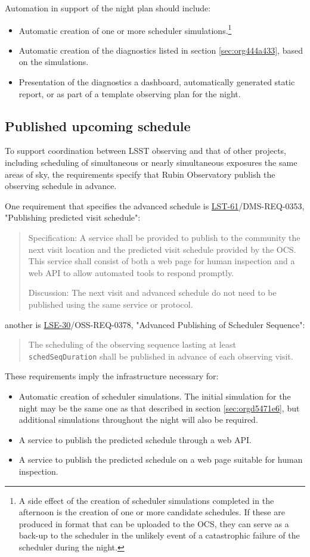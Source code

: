 Automation in support of the night plan should include:
\begin{itemize}
\item Automatic creation of one or more scheduler simulations.\footnote{A side effect of the creation of scheduler simulations completed in the afternoon is the creation of one or more candidate schedules. If these are produced in format that can be uploaded to the OCS, they can serve as a back-up to the scheduler in the unlikely event of a catastrophic failure of the scheduler during the night.}
\item Automatic creation of the diagnostics listed in section \ref{sec:org444a433}, based on the simulations.
\item Presentation of the diagnostics a dashboard, automatically generated static report, or as part of a template observing plan for the night.
\end{itemize}

\subsection{Published upcoming schedule}
\label{sec:org84e90d3}
To support coordination between LSST observing and that of other projects, including scheduling of simultaneous or nearly simultaneous exposures the same areas of sky, the requirements specify that Rubin Observatory publish the observing schedule in advance.

One requirement that specifies the advanced schedule is \href{https://ls.st/lse-61}{LST-61}/DMS-REQ-0353, "Publishing predicted visit schedule":
\begin{quote}
Specification: A service shall be provided to publish to the community the next visit location and the predicted visit schedule provided by the OCS. This service shall consist of both a web page for human inspection and a web API to allow automated tools to respond promptly.

Discussion: The next visit and advanced schedule do not need to be published using the same service or protocol.
\end{quote}
another is \href{https://ls.st/lse-30}{LSE-30}/OSS-REQ-0378, "Advanced Publishing of Scheduler Sequence":
\begin{quote}
The scheduling of the observing sequence lasting at least \texttt{schedSeqDuration} shall be published in advance of each observing visit.
\end{quote}

These requirements imply the infrastructure necessary for:
\begin{itemize}
\item Automatic creation of scheduler simulations. The initial simulation for the night may be the same one as that described in section \ref{sec:orgd5471e6}, but additional simulations throughout the night will also be required.
\item A service to publish the predicted schedule through a web API.
\item A service to publish the predicted schedule on a web page suitable for human inspection.
\end{itemize}

